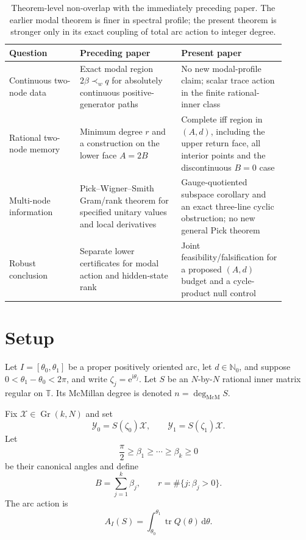 \documentclass[11pt]{article}
\theoremstyle{definition}
\theoremstyle{remark}
\newcommand{\T}{\mathbb T}
\newcommand{\tr}{\operatorname{tr}}
\newcommand{\dd}{\mathrm d}
\newcommand{\e}{\mathrm e}
\newcommand{\mcdeg}{\deg_{\mathrm{McM}}}
\newcommand{\Gr}{\operatorname{Gr}}
\begin{document}
\begin{table}[t]
\centering
\small
\begin{tabular}{@{}>{\raggedright\arraybackslash}p{0.23\linewidth}
>{\raggedright\arraybackslash}p{0.33\linewidth}
>{\raggedright\arraybackslash}p{0.34\linewidth}@{}}
\toprule
Question & Preceding paper \cite{ErikssonDelayRegions2026} & Present paper \\
\midrule
Continuous two-node data
& Exact modal region $2\beta\prec_w q$ for absolutely continuous positive-generator paths
& No new modal-profile claim; scalar trace action in the finite rational-inner class \\
Rational two-node memory
& Minimum degree $r$ and a construction on the lower face $A=2B$
& Complete iff region in $(A,d)$, including the upper return face, all interior points and the discontinuous $B=0$ case \\
Multi-node information
& Pick--Wigner--Smith Gram/rank theorem for specified unitary values and local derivatives
& Gauge-quotiented subspace corollary and an exact three-line cyclic obstruction; no new general Pick theorem \\
Robust conclusion
& Separate lower certificates for modal action and hidden-state rank
& Joint feasibility/falsification for a proposed $(A,d)$ budget and a cycle-product null control \\
\bottomrule
\end{tabular}
\caption{Theorem-level non-overlap with the immediately preceding paper.
The earlier modal theorem is finer in spectral profile; the present theorem
is stronger only in its exact coupling of total arc action to integer degree.}
\label{tab:companion}
\end{table}

\section{Setup}

Let $I=[\theta_0,\theta_1]$ be a proper positively oriented arc, let
$d\in\mathbb N_0$, and suppose
$0<\theta_1-\theta_0<2\pi$, and write
$\zeta_j=\e^{\mathrm i\theta_j}$.  Let $S$ be an $N$-by-$N$ rational inner
matrix regular on $\T$.  Its McMillan degree is denoted $n=\mcdeg S$.

Fix $\mathcal X\in\Gr(k,N)$ and set
\[
 \mathcal Y_0=S(\zeta_0)\mathcal X,
 \qquad
 \mathcal Y_1=S(\zeta_1)\mathcal X.
\]
Let
\[
 \frac{\pi}{2}\ge\beta_1\ge\cdots\ge\beta_k\ge0
\]
be their canonical angles and define
\begin{equation}\label{eq:Br}
 B=\sum_{j=1}^k\beta_j,
 \qquad
 r=\#\{j:\beta_j>0\}.
\end{equation}
The arc action is
\begin{equation}\label{eq:action}
 A_I(S)=\int_{\theta_0}^{\theta_1}\tr Q(\theta)\,\dd\theta.
\end{equation}
\end{document}
